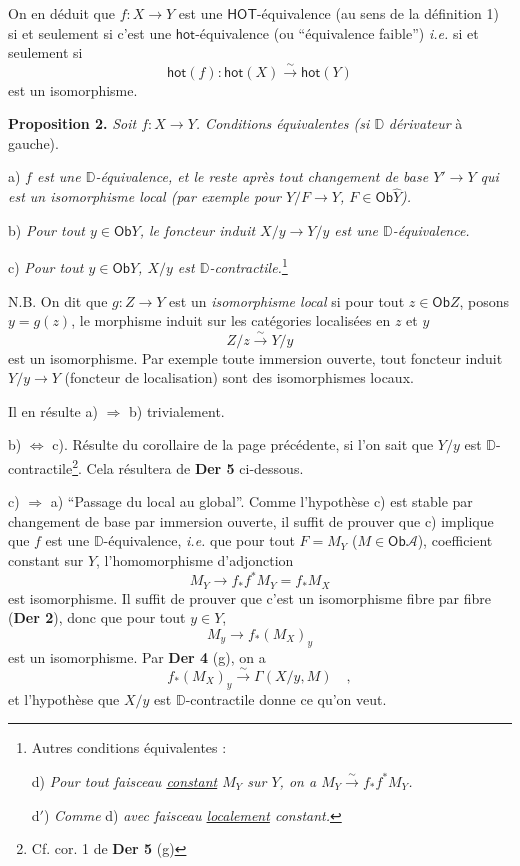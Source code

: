 \documentclass[11pt]{article}
\newcommand{\printedpage}[1]{\marginpar{\footnotesize p.~#1}}
\newcommand{\msp}[1]{\marginpar{\footnotesize [#1]}}
\newcommand{\Ob}{\mathsf{Ob}}
\newcommand{\DD}{\mathbb{D}}
\newcommand{\HOT}{\mathsf{HOT}}
\newcommand{\cA}{\mathcal{A}}
\newcommand{\hot}{\mathsf{hot}}
\newcommand{\isoto}{\overset{\sim}{\to}}
\newcommand{\isolongto}{\overset{\sim}{\longrightarrow}}
\begin{document}
\noindent\msp{page 63}

\noindent On en déduit que $f : X \to Y$ est une $\HOT$-équivalence (au sens de la définition 1) si et seulement si c'est une $\hot$-équivalence (ou “équivalence faible”) \textit{i.e.} si et seulement si
\[
\hot(f) : \hot(X) \isolongto \hot(Y)
\]
\printedpage{37}
est un isomorphisme.

\noindent\textbf{Proposition 2.} \textit{Soit $f : X \to Y$. Conditions équivalentes (si $\DD$} \textit{dérivateur} à gauche). %

a) \textit{$f$ est une $\DD$-équivalence, et le reste après tout changement de base $Y' \to Y$ qui est un isomorphisme local (par exemple pour $Y/F \to Y$, $F \in \Ob \widehat{Y}$).}

b) \textit{Pour tout $y \in \Ob Y$, le foncteur induit $X/y \to Y/y$ est une $\DD$-équivalence.}

c) \textit{Pour tout $y \in \Ob Y$, $X/y$ est $\DD$-contractile.}\footnote[25]{Autres conditions équivalentes :\par
\indent d) \textit{Pour tout faisceau \underline{constant} $M_Y$ sur $Y$, on a $M_Y \isoto f_*f^*M_Y$.}\par
\indent d$'$) \textit{Comme} d) \textit{avec faisceau \underline{localement} constant.}}

\noindent N.B. On dit que $g : Z \to Y$ est un \textit{isomorphisme local} si pour tout $z \in \Ob Z$, posons $y = g(z)$, le morphisme induit sur les catégories localisées en $z$ et $y$
\[
Z/z \isolongto Y/y
\]
est un isomorphisme. Par exemple toute immersion ouverte, tout foncteur induit $Y/y \to Y$ (foncteur de localisation) sont des isomorphismes locaux.

Il en résulte a) $\Rightarrow$ b) trivialement.

b) $\Leftrightarrow$ c). Résulte du corollaire de la page précédente, si l'on sait que $Y/y$ est $\DD$-contractile\footnote[26]{Cf. cor. 1 de \textbf{Der 5} (g)}. Cela résultera de \textbf{Der 5} ci-dessous.

\noindent\msp{page 64}

c) $\Rightarrow$ a) “Passage du local au global”. Comme l'hypothèse c) est stable par changement de base par immersion ouverte, il suffit de prouver que c) implique que $f$ est une $\DD$-équivalence, \textit{i.e.} que pour tout $F = M_Y$ ($M \in \Ob \cA$), coefficient constant sur $Y$, l'homomorphisme d'adjonction
\[
M_Y \longrightarrow f_*f^*M_Y = f_*M_X
\]
est isomorphisme. Il suffit de prouver que c'est un isomorphisme fibre par fibre (\textbf{Der 2}), donc que pour tout $y \in Y$,
\[
M_y \longrightarrow f_*(M_X)_y
\]
est un isomorphisme. Par \textbf{Der 4} (g), on a
\[
f_*(M_X)_y \isolongto \Gamma(X/y, M) \quad ,
\]
et l'hypothèse que $X/y$ est $\DD$-contractile donne ce qu'on veut.
\end{document}

